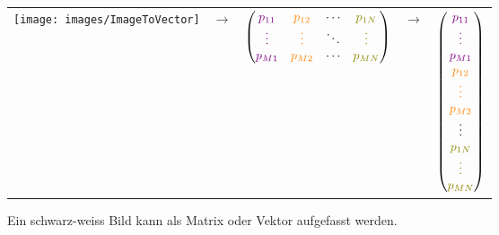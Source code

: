 \begin{figure}[ht]
	\centering
	\begin{tabular}{m{3.5cm} m{1cm} c m{1cm} c}
		\texttt{[image: images/ImageToVector]} &
		$\longrightarrow$ &
		$\begin{pmatrix}
			\textcolor{violet}{p_{11}} & \textcolor{orange}{p_{12}} & \cdots & \textcolor{olive}{p_{1N}} \\
			\textcolor{violet}{\vdots} & \textcolor{orange}{\vdots} & \ddots & \textcolor{olive}{\vdots} \\
			\textcolor{violet}{p_{M1}} & \textcolor{orange}{p_{M2}} & \cdots &  \textcolor{olive}{p_{MN}} \\
		\end{pmatrix}$ &
		$\longrightarrow$ &
		$\begin{pmatrix}
			\textcolor{violet}{p_{11}} \\
			\textcolor{violet}{\vdots} \\
			\textcolor{violet}{p_{M1}} \\
			\textcolor{orange}{p_{12}} \\
			\textcolor{orange}{\vdots} \\
			\textcolor{orange}{p_{M2}} \\
			\vdots \\
			\textcolor{olive}{p_{1N}} \\
			\textcolor{olive}{\vdots} \\
			\textcolor{olive}{p_{MN}} \\
		\end{pmatrix}$
	\end{tabular}
	\caption{Ein schwarz-weiss Bild kann als Matrix oder Vektor aufgefasst werden.}
	\label{fig:image_to_vector}
\end{figure}
\pagebreak[4]
